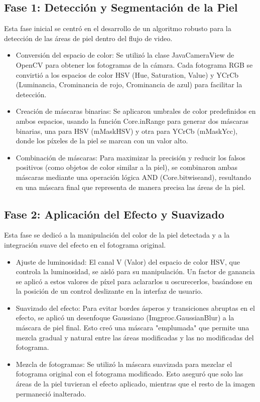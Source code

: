 \documentclass[conference]{IEEEtran}
\begin{document}
\subsection{Fase 1: Detección y Segmentación de la Piel}
Esta fase inicial se centró en el desarrollo de un algoritmo robusto para la detección de las áreas de piel dentro del flujo de video.
\begin{itemize}
\item Conversión del espacio de color: Se utilizó la clase JavaCameraView de OpenCV para obtener los fotogramas de la cámara. Cada fotograma RGB se convirtió a los espacios de color HSV (Hue, Saturation, Value) y YCrCb (Luminancia, Crominancia de rojo, Crominancia de azul) para facilitar la detección\cite{c5}.
\item Creación de máscaras binarias: Se aplicaron umbrales de color predefinidos en ambos espacios, usando la función Core.inRange para generar dos máscaras binarias, una para HSV (mMaskHSV) y otra para YCrCb (mMaskYcc), donde los píxeles de la piel se marcan con un valor alto.
\item Combinación de máscaras: Para maximizar la precisión y reducir los falsos positivos (como objetos de color similar a la piel), se combinaron ambas máscaras mediante una operación lógica AND (Core.bitwiseand), resultando en una máscara final que representa de manera precisa las áreas de la piel.
\end{itemize}

\subsection{Fase 2: Aplicación del Efecto y Suavizado}
Esta fase se dedicó a la manipulación del color de la piel detectada y a la integración suave del efecto en el fotograma original.
\begin{itemize}
\item Ajuste de luminosidad: El canal V (Valor) del espacio de color HSV, que controla la luminosidad, se aisló para su manipulación. Un factor de ganancia se aplicó a estos valores de píxel para aclararlos u oscurecerlos, basándose en la posición de un control deslizante en la interfaz de usuario.
\item Suavizado del efecto: Para evitar bordes ásperos y transiciones abruptas en el efecto, se aplicó un desenfoque Gaussiano (Imgproc.GaussianBlur)\cite{c6} a la máscara de piel final. Esto creó una máscara "emplumada" que permite una mezcla gradual y natural entre las áreas modificadas y las no modificadas del fotograma\cite{c7}.
\item Mezcla de fotogramas: Se utilizó la máscara suavizada para mezclar el fotograma original con el fotograma modificado. Esto aseguró que solo las áreas de la piel tuvieran el efecto aplicado, mientras que el resto de la imagen permaneció inalterado.
\end{itemize}
\end{document}
